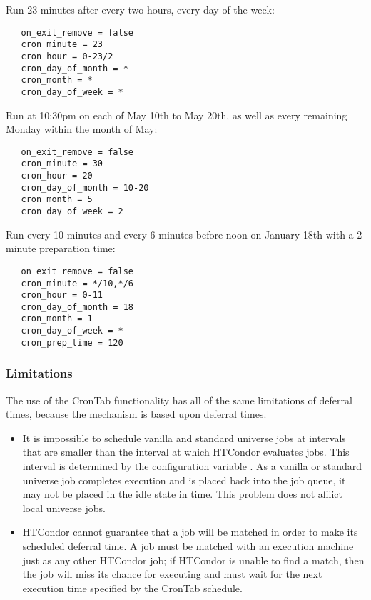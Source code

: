Run 23 minutes after every two hours, every day of the week:

\begin{verbatim}
   on_exit_remove = false
   cron_minute = 23
   cron_hour = 0-23/2
   cron_day_of_month = *
   cron_month = *
   cron_day_of_week = *
\end{verbatim}

Run at 10:30pm on each of May 10th to May 20th, as well as every 
remaining Monday within the month of May:

\begin{verbatim}
   on_exit_remove = false
   cron_minute = 30
   cron_hour = 20
   cron_day_of_month = 10-20
   cron_month = 5
   cron_day_of_week = 2
\end{verbatim}

Run every 10 minutes and every 6 minutes before noon 
on January 18th with a 2-minute preparation time:

\begin{verbatim}
   on_exit_remove = false
   cron_minute = */10,*/6
   cron_hour = 0-11
   cron_day_of_month = 18
   cron_month = 1
   cron_day_of_week = *
   cron_prep_time = 120
\end{verbatim}

\subsubsection{Limitations}
\label{sec:Crontab-Limitations}
The use of the CronTab functionality has all of the same 
limitations of deferral times,
because the mechanism is based upon deferral times.

\begin{itemize}
\item It is impossible to schedule vanilla 
and standard universe jobs 
at intervals that are smaller than the
interval at which HTCondor evaluates jobs.
This interval is determined by 
the configuration variable . 
As a vanilla or standard universe job completes execution 
and is placed back into the job queue, 
it may not be placed in the idle state in time.
This problem does not afflict local universe jobs.

\item HTCondor cannot guarantee that a job will be
matched in order to make its scheduled deferral time.
A job must be matched with an execution machine just as
any other HTCondor job; 
if HTCondor is unable to find a match, 
then the job will miss its chance for executing
and must wait for the next execution time 
specified by the CronTab schedule.

\end{itemize}
